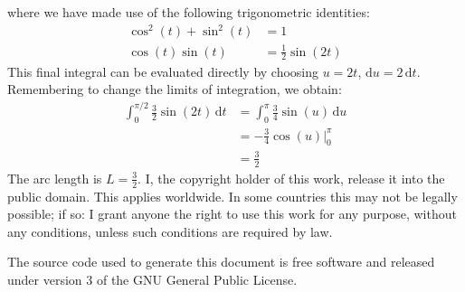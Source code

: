 \documentclass{article}
\begin{document}
        where we have made use of the following trigonometric identities:
        \begin{subequations}
            \begin{align}
                \cos^{2}(t)+\sin^{2}(t)&=1\\
                \cos(t)\sin(t)&=\frac{1}{2}\sin(2t)
            \end{align}
        \end{subequations}
        This final integral can be evaluated directly
        by choosing $u=2t$, $\textrm{d}u=2\,\textrm{d}t$.
        Remembering to change the limits of integration, we obtain:
        \begin{subequations}
            \begin{align}
                \int_{0}^{\pi/2}\frac{3}{2}\sin(2t)\,\textrm{d}t
                &=\int_{0}^{\pi}\frac{3}{4}\sin(u)\,\textrm{d}u\\
                &=-\frac{3}{4}\cos(u)\Big|_{0}^{\pi}\\
                &=\frac{3}{2}
            \end{align}
        \end{subequations}
        The arc length is $L=\frac{3}{2}$.
        \color{black}
    \fi
    \newpage
    I, the copyright holder of this work, release it into the public domain.
    This applies worldwide. In some countries this may not be legally possible;
    if so: I grant anyone the right to use this work for any purpose, without
    any conditions, unless such conditions are required by law.
    \par\hfill\par
    The source code used to generate this document is free software and released
    under version 3 of the GNU General Public License.
\end{document}
